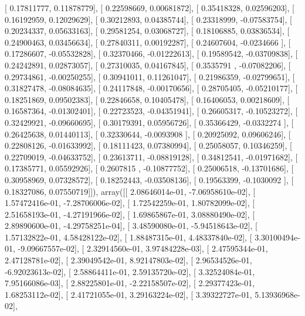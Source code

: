 \documentclass{article}
\begin{document}
       [ 0.17811777,  0.11878779],
       [ 0.22598669,  0.00681872],
       [ 0.35418328,  0.02596203],
       [ 0.16192959,  0.12029629],
       [ 0.30212893,  0.04385744],
       [ 0.23318999, -0.07583754],
       [ 0.20234337,  0.05633163],
       [ 0.29581254,  0.03068727],
       [ 0.18106885,  0.03836534],
       [ 0.24900463,  0.03456634],
       [ 0.27840311,  0.00192287],
       [ 0.24607604, -0.0234666 ],
       [ 0.17286607, -0.05532828],
       [ 0.32370466, -0.01222613],
       [ 0.19589542, -0.03709838],
       [ 0.24242891,  0.02873057],
       [ 0.27310035,  0.04167845],
       [ 0.3535791 , -0.07082206],
       [ 0.29734861, -0.00250255],
       [ 0.30941011,  0.11261047],
       [ 0.21986359, -0.02799651],
       [ 0.31827478, -0.08084635],
       [ 0.24117848, -0.00170656],
       [ 0.28705405, -0.05210177],
       [ 0.18251869,  0.09502383],
       [ 0.22846658,  0.10405478],
       [ 0.16406053,  0.00218609],
       [ 0.16587364, -0.01302401],
       [ 0.22723523, -0.04351941],
       [ 0.26605317, -0.10523272],
       [ 0.32429921, -0.09660695],
       [ 0.30179391,  0.05956726],
       [ 0.35366429, -0.0332274 ],
       [ 0.26425638,  0.01440113],
       [ 0.32330644, -0.0093908 ],
       [ 0.20925092,  0.09606246],
       [ 0.22808126, -0.01633992],
       [ 0.18111423,  0.07380994],
       [ 0.25058057,  0.10346259],
       [ 0.22709019, -0.04633752],
       [ 0.23613711, -0.08819128],
       [ 0.34812541, -0.01971682],
       [ 0.17385771,  0.05592926],
       [ 0.2607815 , -0.10877752],
       [ 0.25006518, -0.13701686],
       [ 0.30958969,  0.07328572],
       [ 0.18252443, -0.03508136],
       [ 0.19563399, -0.1030092 ],
       [ 0.18327086,  0.07550719]]), array([[  2.08646014e-01,  -7.06958610e-02],
       [  1.57472416e-01,  -7.28706006e-02],
       [  1.72542259e-01,   1.80782099e-02],
       [  2.51658193e-01,  -4.27191966e-02],
       [  1.69865867e-01,   3.08880490e-02],
       [  2.89890600e-01,  -4.29758251e-04],
       [  3.48590080e-01,  -5.94518643e-02],
       [  1.57132822e-01,   4.58428122e-02],
       [  1.88487315e-01,   4.48337840e-02],
       [  3.30100494e-01,  -9.09667557e-02],
       [  2.32914560e-01,   3.97484228e-03],
       [  2.47595344e-01,   2.47128781e-02],
       [  2.39049542e-01,   8.92147803e-02],
       [  2.96534526e-01,  -6.92023613e-02],
       [  2.58864411e-01,   2.59135720e-02],
       [  3.32524084e-01,   7.95166086e-03],
       [  2.88225801e-01,  -2.22158507e-02],
       [  2.29377423e-01,   1.68253112e-02],
       [  2.41721055e-01,   3.29163224e-02],
       [  3.39322727e-01,   5.13936968e-02],
\end{document}
